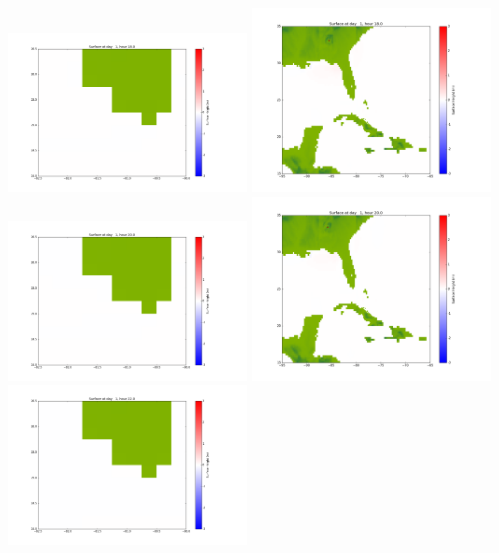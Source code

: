 \documentclass[11pt]{article}
\begin{document}
\vskip 10pt 
\includegraphics[width=0.475\textwidth]{frame0045fig1001.png}
\includegraphics[width=0.475\textwidth]{frame0045fig1002.png}
\vskip 10pt 
\includegraphics[width=0.475\textwidth]{frame0046fig1001.png}
\includegraphics[width=0.475\textwidth]{frame0046fig1002.png}
\vskip 10pt 
\includegraphics[width=0.475\textwidth]{frame0047fig1001.png}
\end{document}
